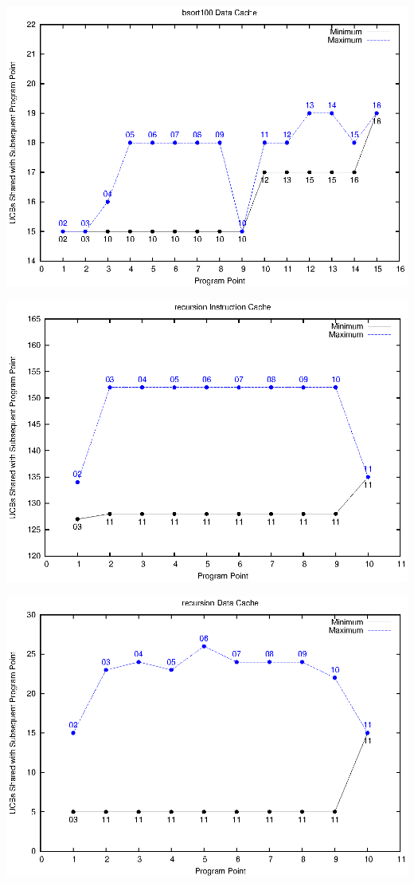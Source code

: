 \begin{center}
  \includegraphics[width=\linewidth]{eps/bsort-dcache.eps}
\end{center}

\begin{center}
  \includegraphics[width=\linewidth]{eps/recursion-icache.eps}
\end{center}

\begin{center}
  \includegraphics[width=\linewidth]{eps/recursion-dcache.eps}
\end{center}

